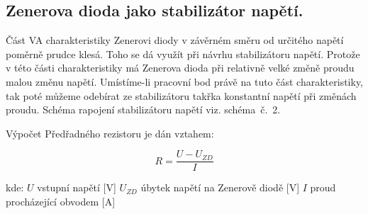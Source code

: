   \subsection{Zenerova dioda jako stabilizátor napětí.}
    \indent\indent
    Část VA charakteristiky Zenerovi diody v závěrném směru od určitého napětí poměrně prudce klesá. Toho se dá využít při návrhu stabilizátoru napětí. Protože v této části charakteristiky má Zenerova dioda při relativně velké změně proudu malou změnu napětí. Umístíme-li pracovní bod právě na tuto část charakteristiky, tak poté můžeme odebírat ze stabilizátoru takřka konstantní napětí při změnách proudu. Schéma rapojení stabilizátoru napětí viz. schéma~č.~2.
    
    Výpočet Předřadného rezistoru je dán vztahem:
    
    \begin{equation}
      R = \frac{U-U_{ZD}}{I}
    \end{equation}
    
    \hspace*{2cm}kde:\newline    
    \hspace*{4cm}$U$ \dotfill vstupní napětí [V]\hspace*{4cm}\newline
    \hspace*{4cm}$U_{ZD}$ \dotfill úbytek napětí na Zenerově diodě [V]\hspace*{4cm}\newline
    \hspace*{4cm}$I$ \dotfill proud procházející obvodem [A]\hspace*{4cm}\newline
